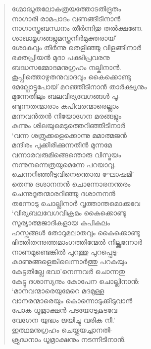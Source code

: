 \begin{verse}
ഗ്മോദ്ധൂതലോകത്രയത്തോടതിദ്രുതം\\
നാഗാരി രാമപാദം വണങ്ങീടിനാന്‍\\
നാഗാസ്ത്രബന്ധനം തീര്‍ന്നിതു തല്‍ക്ഷണേ.\\
ശാഖാമൃഗങ്ങളുമസ്ത്രനിര്‍മുക്തരായ്\\
ശോകവും തീര്‍ന്നു തെളിഞ്ഞു വിളങ്ങിനാര്‍\\
ഭക്തപ്രിയന്‍ മുദാ പക്ഷിപ്രവരനു\\
ബദ്ധസമ്മോദമനുഗ്രഹം നല്കിനാന്‍.\\
കൂപ്പിത്തൊഴുതനുവാദവും കൈക്കൊണ്ടു\\
മേല്പോട്ടുപോയ് മറഞ്ഞീടിനാന്‍ താര്‍ക്ഷ്യനും\\
മുന്നേതിലും ബലവീര്യവേഗങ്ങള്‍ പൂ-\\
ണ്ടുന്നതന്മാരാം കപിവരന്മാരെല്ലാം\\
മന്നവന്‍തന്‍ നിയോഗേന മരങ്ങളും\\
കുന്നും ശിലയുമെടുത്തെറിഞ്ഞീടിനാര്‍\\
‘വന്ന ശത്രുക്കളെക്കൊന്നു മമാത്മജന്‍\\
മന്ദിരം പുക്കിരിക്കുന്നതിന്‍ മുന്നമേ\\
വന്നാരവരുമിങ്ങെന്തൊരു വിസ്മയം\\
നന്നുനന്നെത്രയുമെന്നേ പറയാവൂ.\\
ചെന്നറിഞ്ഞീടുവിനെന്തൊരു ഘോഷമി’\\
തെന്നു ദശാനനന്‍ ചൊന്നോരനന്തരം\\
ചെന്നുദൂതന്മാരറിഞ്ഞു ദശാനനന്‍\\
തന്നോടു ചൊല്ലിനാര്‍ വൃത്താന്തമൊക്കവേ\\
‘വീര്യബലവേഗവിക്രമം കൈക്കൊണ്ടു\\
സൂര്യാത്മജാദികളായ കപികുലം\\
ഹസ്തങ്ങള്‍ തോറുമലാതവും കൈക്കൊണ്ടു\\
ഭിത്തിതന്നുത്തമാംഗത്തിന്മേല്‍ നില്ക്കുന്നോര്‍\\
നാണമുണ്ടെങ്കില്‍ പുറത്തു പുറപ്പെടു-\\
കാണുങ്ങളെങ്കിലെന്നാര്‍ത്തു പറകയും\\
കേട്ടതില്ലേ ഭവാ’നെന്നവര്‍ ചൊന്നതു\\
കേട്ടു ദശാസ്യനും കോപേന ചൊല്ലിനാന്‍:\\
‘മാനവന്മാരെയുമേറെ മദമുള്ള\\
വാനരന്മാരെയും കൊന്നൊടുക്കീടുവാന്‍\\
പോക ധൂമ്രാക്ഷന്‍ പടയോടുകൂടവേ\\
വേഗേന യുദ്ധം ജയിച്ചു വരിക നീ.’\\
ഇത്ഥമനുഗ്രഹം ചെയ്തയച്ചാനതി-\\
ക്രുദ്ധനാം ധൂമ്രാക്ഷനും നടന്നീടിനാന്‍.\\

\end{verse}
